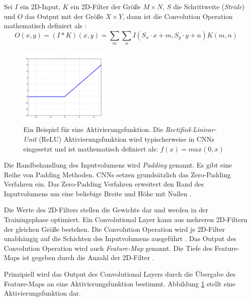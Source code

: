 Sei $I$ ein 2D-Input, $K$ ein 2D-Filter der Größe $M \times N$, $S$ die Schrittweite (\textit{Stride}) und $O$ das Output mit der Größe $X \times Y$, dann ist die Convolution Operation mathematisch definiert als \cite{goodfellowDeepLearning2016}:
\begin{equation}
	\label{eq:convolution}
	O(x,y) = (I * K)(x,y) = \sum_{m}\sum_{n}I(S_x \cdot x+m, S_y \cdot y+n)K(m,n)
\end{equation}
\begin{figure}
	\centering
	\includegraphics[width=0.4\textwidth]{images/ann_conv/ReLU.png}
	\caption{Ein Beispiel für eine Aktivierungsfunktion. Die \textit{Rectified-Liniear-Unit} (ReLU) Aktivierungsfunktion wird typischerweise in CNNs eingesetzt und ist mathematisch definiert als: $f(x) = max(0,x)$ \cite{goodfellowDeepLearning2016} }
	\label{fig:relu}
\end{figure}

Die Randbehandlung des Inputvolumens wird \textit{Padding} genannt. Es gibt eine Reihe von Padding Methoden. CNNs setzen grundsätzlich das Zero-Padding Verfahren ein. Das Zero-Padding Verfahren erweitert den Rand des Inputvolumens um eine beliebige Breite und Höhe mit Nullen \cite{johnsonCS231nConvolutionalNeurala}. 

Die Werte des 2D-Filters stellen die Gewichte dar und werden in der Trainingsphase optimiert. Ein Convolutional Layer kann aus mehreren 2D-Filtern der gleichen Größe bestehen. Die Convolution Operation wird je 2D-Filter unabhängig auf die Schichten des Inputvolumens ausgeführt \cite{johnsonCS231nConvolutionalNeurala}. Das Output des Convolution Operation wird auch \textit{Feature-Map} genannt. Die Tiefe des Feature-Maps ist gegeben durch die Anzahl der 2D-Filter \cite{yamashitaConvolutionalNeuralNetworks2018}.

Prinzipiell wird das Output des Convolutional Layers durch die Übergabe des Feature-Maps an eine Aktivierungsfunktion bestimmt. Abbildung \ref{fig:relu} stellt eine Aktivierungsfunktion dar.

